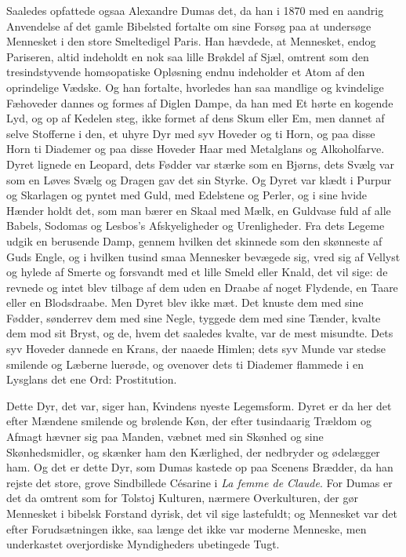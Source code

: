 \documentclass[12pt,a4paper]{article}
\begin{document}
Saaledes opfattede ogsaa Alexandre Dumas det, da han i 1870 med en
aandrig Anvendelse af det gamle Bibelsted fortalte om sine Forsøg paa at
undersøge Mennesket i den store Smeltedigel Paris. Han hævdede, at
Mennesket, endog Pariseren, altid indeholdt en nok saa lille Brøkdel af
Sjæl, omtrent som den tresindstyvende homøopatiske Opløsning endnu
indeholder et Atom af den oprindelige Vædske. Og han fortalte, hvorledes
han saa mandlige og kvindelige Fæhoveder dannes og formes af Diglen
Dampe, da han med Et hørte en kogende Lyd, og op af Kedelen steg, ikke
formet af dens Skum eller Em, men dannet af selve Stofferne i den, et
uhyre Dyr med syv Hoveder og ti Horn, og paa disse Horn ti Diademer og
paa disse Hoveder Haar med Metalglans og Alkoholfarve. Dyret lignede en
Leopard, dets Fødder var stærke som en Bjørns, dets Svælg var som en
Løves Svælg og Dragen gav det sin Styrke. Og Dyret var klædt i Purpur og
Skarlagen og pyntet med Guld, med Edelstene og Perler, og i sine hvide
Hænder holdt det, som man bærer en Skaal med Mælk, en Guldvase fuld af
alle Babels, Sodomas og Lesbos's Afskyeligheder og Urenligheder. Fra dets
Legeme udgik en berusende Damp, gennem hvilken det skinnede som den
skønneste af Guds Engle, og i hvilken tusind smaa Mennesker bevægede sig,
vred sig af Vellyst og hylede af Smerte og forsvandt med et lille Smeld
eller Knald, det vil sige: de revnede og intet blev tilbage af dem uden
en Draabe af noget Flydende, en Taare eller en Blodsdraabe. Men Dyret
blev ikke mæt. Det knuste dem med sine Fødder, sønderrev dem med sine
Negle, tyggede dem med sine Tænder, kvalte dem mod sit Bryst, og de,
hvem det saaledes kvalte, var de mest misundte. Dets syv Hoveder dannede
en Krans, der naaede Himlen; dets syv Munde var stedse smilende og
Læberne luerøde, og ovenover dets ti Diademer flammede i en Lysglans det
ene Ord: Prostitution.

Dette Dyr, det var, siger han, Kvindens nyeste Legemsform. Dyret er da
her det efter Mændene smilende og brølende Køn, der efter tusindaarig
Trældom og Afmagt hævner sig paa Manden, væbnet med sin Skønhed og sine
Skønhedsmidler, og skænker ham den Kærlighed, der nedbryder og ødelægger
ham. Og det er dette Dyr, som Dumas kastede op paa Scenens Brædder, da
han rejste det store, grove Sindbillede Césarine i \textit{La femme de
Claude}. For Dumas er det da omtrent som for Tolstoj Kulturen, nærmere
Overkulturen, der gør Mennesket i bibelsk Forstand dyrisk, det vil sige
lastefuldt; og Mennesket var det efter Forudsætningen ikke, saa længe det
ikke var moderne Menneske, men underkastet overjordiske Myndigheders
ubetingede Tugt.
\end{document}

